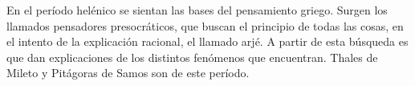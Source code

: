 En el período helénico se sientan las bases del pensamiento griego. Surgen los llamados pensadores presocráticos, que buscan el principio de todas las cosas, en el intento de la explicación racional, el llamado arjé. A partir de esta búsqueda es que dan explicaciones de los distintos fenómenos que encuentran. Thales de Mileto y Pitágoras de Samos son de este período.